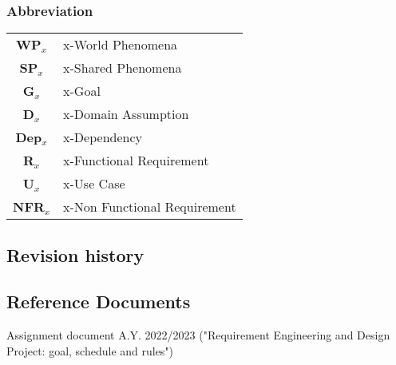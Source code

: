 \subsubsection{Abbreviation}
\begin{table}[H]
    \begin{tabularx}{\textwidth}{cX}
        \toprule
        \textbf{WP$_x$}  & x-World Phenomena            \\
        \textbf{SP$_x$}  & x-Shared Phenomena           \\
        \textbf{G$_x$}   & x-Goal                       \\
        \textbf{D$_x$}   & x-Domain Assumption          \\
        \textbf{Dep$_x$} & x-Dependency                 \\
        \textbf{R$_x$}   & x-Functional Requirement     \\
        \textbf{U$_x$}   & x-Use Case                   \\
        \textbf{NFR$_x$} & x-Non Functional Requirement \\
        \bottomrule
    \end{tabularx}
\end{table}

\subsection{Revision history}

\subsection{Reference Documents}
Assignment document A.Y. 2022/2023 ("Requirement Engineering and Design Project: goal, schedule and rules")


